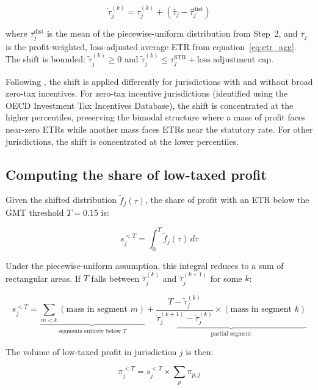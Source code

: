 \documentclass[11pt,a4paper]{article}
\begin{document}
\begin{equation}\label{eq:shift}
\tilde{\tau}_j^{(k)} = \tau_j^{(k)} + \left(\bar{\tau}_j - \bar{\tau}_j^{\text{dist}}\right)
\end{equation}

where $\bar{\tau}_j^{\text{dist}}$ is the mean of the piecewise-uniform distribution from Step~2, and $\bar{\tau}_j$ is the profit-weighted, loss-adjusted average ETR from equation~\eqref{eq:etr_agg}. The shift is bounded: $\tilde{\tau}_j^{(k)} \geq 0$ and $\tilde{\tau}_j^{(k)} \leq \tau_j^{\text{STR}} + \text{loss adjustment cap}$.

Following \citet{hugger2025}, the shift is applied differently for jurisdictions with and without broad zero-tax incentives. For zero-tax incentive jurisdictions (identified using the OECD Investment Tax Incentives Database), the shift is concentrated at the higher percentiles, preserving the bimodal structure where a mass of profit faces near-zero ETRs while another mass faces ETRs near the statutory rate. For other jurisdictions, the shift is concentrated at the lower percentiles.

\subsection{Computing the share of low-taxed profit}\label{sec:lowtaxed}

Given the shifted distribution $\tilde{f}_j(\tau)$, the share of profit with an ETR below the GMT threshold $T = 0.15$ is:

\begin{equation}\label{eq:lowtax_share}
s_j^{<T} = \int_0^{T} \tilde{f}_j(\tau) \, d\tau
\end{equation}

Under the piecewise-uniform assumption, this integral reduces to a sum of rectangular areas. If $T$ falls between $\tilde{\tau}_j^{(k)}$ and $\tilde{\tau}_j^{(k+1)}$ for some $k$:

\begin{equation}\label{eq:lowtax_share_pw}
s_j^{<T} = \underbrace{\sum_{m < k} (\text{mass in segment } m)}_{\text{segments entirely below } T} + \underbrace{\frac{T - \tilde{\tau}_j^{(k)}}{\tilde{\tau}_j^{(k+1)} - \tilde{\tau}_j^{(k)}} \times (\text{mass in segment } k)}_{\text{partial segment}}
\end{equation}

The volume of low-taxed profit in jurisdiction $j$ is then:

\begin{equation}\label{eq:lowtax_profit}
\pi_j^{<T} = s_j^{<T} \times \sum_p \pi_{p,j}
\end{equation}
\end{document}
